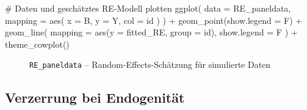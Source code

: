 \documentclass[
  a4paper,
  DIV=11,
  oneside]{scrreprt}
\newenvironment{Shaded}{\begin{snugshade}}{\end{snugshade}}
\newcommand{\AttributeTok}[1]{\textcolor[rgb]{0.40,0.45,0.13}{#1}}
\newcommand{\CommentTok}[1]{\textcolor[rgb]{0.37,0.37,0.37}{#1}}
\newcommand{\FunctionTok}[1]{\textcolor[rgb]{0.28,0.35,0.67}{#1}}
\newcommand{\NormalTok}[1]{\textcolor[rgb]{0.00,0.23,0.31}{#1}}
\newcommand{\SpecialCharTok}[1]{\textcolor[rgb]{0.37,0.37,0.37}{#1}}
\begin{document}
\begin{Shaded}
\begin{Highlighting}[]
\CommentTok{\# Daten und geschätztes RE{-}Modell plotten}
\FunctionTok{ggplot}\NormalTok{(}
  \AttributeTok{data =}\NormalTok{ RE\_paneldata, }
  \AttributeTok{mapping =} 
    \FunctionTok{aes}\NormalTok{(}
      \AttributeTok{x =}\NormalTok{ B, }
      \AttributeTok{y =}\NormalTok{ Y, }
      \AttributeTok{col =}\NormalTok{ id}
\NormalTok{    )}
\NormalTok{) }\SpecialCharTok{+} 
  \FunctionTok{geom\_point}\NormalTok{(}\AttributeTok{show.legend =}\NormalTok{ F) }\SpecialCharTok{+}
  \FunctionTok{geom\_line}\NormalTok{(}
    \AttributeTok{mapping =} \FunctionTok{aes}\NormalTok{(}\AttributeTok{y =}\NormalTok{ fitted\_RE, }\AttributeTok{group =}\NormalTok{ id), }
    \AttributeTok{show.legend =}\NormalTok{ F}
\NormalTok{  ) }\SpecialCharTok{+}
  \FunctionTok{theme\_cowplot}\NormalTok{()}
\end{Highlighting}
\end{Shaded}

\begin{figure}[t]


\caption{\label{fig-repanelest}\texttt{RE\_paneldata} --
Random-Effects-Schätzung für simulierte Daten}

\end{figure}%

\subsection{Verzerrung bei
Endogenität}\label{verzerrung-bei-endogenituxe4t}
\end{document}

